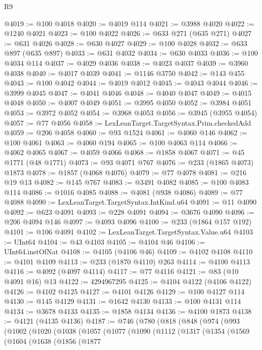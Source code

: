 \begin{lexlean}{R9}
\begin{coremodule}
@4019 := @100 @4018
@4020 := @4019 @114
@4021 := @3988 @4020
@4022 := @1240 @4021
@4023 := @100 @4022
@4026 := @633 @271 (@635 @271)
@4027 := @631 @4026
@4028 := @630 @4027
@4029 := @100 @4028
@4032 := @633 @897 (@635 @897)
@4033 := @631 @4032
@4034 := @630 @4033
@4036 := @100 @4034 @114
@4037 := @4029 @4036
@4038 := @4023 @4037
@4039 := @3960 @4038
@4040 := @4017 @4039
@4041 := @1146 @3750
@4042 := @143 @455
@4043 := @100 @4042
@4044 := @4019 @4012
@4045 := @4043 @4044
@4046 := @3999 @4045
@4047 := @4041 @4046
@4048 := @4040 @4047
@4049 := @4015 @4048
@4050 := @4007 @4049
@4051 := @3995 @4050
@4052 := @3984 @4051
@4053 := @3972 @4052
@4054 := @3968 @4053
@4056 := @3945 (@3955 @4054)
@4057 := @77 @4056
@4058 := LexLeanTarget.TargetSyntax.Prim.checkedAdd
@4059 := @206 @4058
@4060 := @93 @1524
@4061 := @4060 @146
@4062 := @100 @4061
@4063 := @4060 @194
@4065 := @100 @4063 @114
@4066 := @4062 @4065
@4067 := @4059 @4066
@4068 := @1858 @4067
@4071 := @45 @1771 (@48 @1771)
@4073 := @93 @4071 @767
@4076 := @233 (@1865 @4073) @1873
@4078 := @1857 (@4068 @4076)
@4079 := @77 @4078
@4081 := @216 @19 @13
@4082 := @145 @767
@4083 := @3491 @4082
@4085 := @100 @4083 @114
@4086 := @1016 @4085
@4088 := @4081 (@938 @4086)
@4089 := @77 @4088
@4090 := LexLeanTarget.TargetSyntax.IntKind.u64
@4091 := @11 @4090
@4092 := @623 @4091
@4093 := @228 @4091
@4094 := @3676 @4090
@4096 := @206 @4094 @146
@4097 := @4093 @4096
@4100 := @233 (@1864 @157 @192)
@4101 := @106 @4091
@4102 := LexLeanTarget.TargetSyntax.Value.u64
@4103 := UInt64
@4104 := @43 @4103
@4105 := @4104 @46
@4106 := UInt64.instOfNat
@4108 := @4105 (@4106 @46)
@4109 := @4102 @4108
@4110 := @4101 @4109
@4113 := @233 (@1870 @4110) @263
@4114 := @4100 @4113
@4116 := @4092 (@4097 @4114)
@4117 := @77 @4116
@4121 := @83 (@10 @4091 @16) @13
@4122 := 4294967295
@4125 := @4104 @4122 (@4106 @4122)
@4126 := @4102 @4125
@4127 := @4101 @4126
@4129 := @100 @4127 @114
@4130 := @145 @4129
@4131 := @1642 @4130
@4133 := @100 @4131 @114
@4134 := @3678 @4133
@4135 := @1858 @4134
@4136 := @4100 @1873
@4138 := @4121 (@4135 @4136)
@4187 := @746
    (@780
      (@818
        (@848
          (@974
            (@993
              (@1002
                (@1020
                  (@1038
                    (@1057
                      (@1077
                        (@1090
                          (@1112
                            (@1317
                              (@1354
                                (@1569
                                  (@1604
                                    (@1638
                                      (@1856
                                        (@1877

\end{coremodule}
\end{lexlean}
